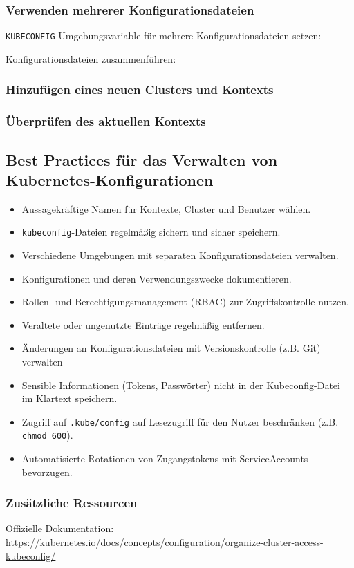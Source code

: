 \subsubsection{Verwenden mehrerer Konfigurationsdateien}
\texttt{KUBECONFIG}-Umgebungsvariable für mehrere Konfigurationsdateien setzen:

\noindent
Konfigurationsdateien zusammenführen:

\subsubsection{Hinzufügen eines neuen Clusters und Kontexts}

\subsubsection{Überprüfen des aktuellen Kontexts}

\subsection{Best Practices für das Verwalten von Kubernetes-Konfigurationen}
\begin{itemize}
    \item Aussagekräftige Namen für Kontexte, Cluster und Benutzer wählen.
    \item \texttt{kubeconfig}-Dateien regelmäßig sichern und sicher speichern.
    \item Verschiedene Umgebungen mit separaten Konfigurationsdateien verwalten.
    \item Konfigurationen und deren Verwendungszwecke dokumentieren.
    \item Rollen- und Berechtigungsmanagement (RBAC) zur Zugriffskontrolle nutzen.
    \item Veraltete oder ungenutzte Einträge regelmäßig entfernen.
    \item Änderungen an Konfigurationsdateien mit Versionskontrolle (z.B. Git) verwalten
    \item Sensible Informationen (Tokens, Passwörter) nicht in der Kubeconfig-Datei im Klartext speichern.
    \item Zugriff auf \texttt{.kube/config} auf Lesezugriff für den Nutzer beschränken (z.B. \texttt{chmod 600}).
    \item Automatisierte Rotationen von Zugangstokens mit ServiceAccounts bevorzugen.
\end{itemize}
\subsubsection{Zusätzliche Ressourcen}
Offizielle Dokumentation:\\
\url{https://kubernetes.io/docs/concepts/configuration/organize-cluster-access-kubeconfig/}

